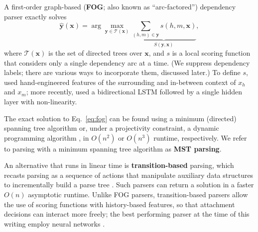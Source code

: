 \documentclass[11pt,letterpaper]{article}
\newcommand{\ignore}[1]{}
\newcommand{\miguelcomment}[1]{\ignore{\textcolor{red}{{\textbf{[#1 --\textsc{miguel}]}}}}}
\begin{document}
A first-order graph-based (\textbf{FOG}; also known as ``arc-factored'') dependency parser exactly solves
\begin{equation}
\boldsymbol{\hat{y}}(\boldsymbol{x}) = \arg\max_{\boldsymbol{y} \in \mathcal{T}(\boldsymbol{x})} \underbrace{\sum_{(h, m) \in \boldsymbol{y}} s(h, m, \boldsymbol{x})}_{S(\boldsymbol{y}, \boldsymbol{x})},
\label{eq:fog}
\end{equation}
where $\mathcal{T}(\boldsymbol{x})$ is the set of directed trees over $\boldsymbol{x}$, and
$s$ is a local scoring function that considers only a single dependency arc at a time.  (We 
suppress dependency labels; there are various ways to incorporate them, discussed later.)
To define $s$,  used hand-engineered features of the surrounding and in-between context of $x_h$ and $x_m$; more recently,  used a bidirectional LSTM followed by a single hidden layer with non-linearity.

The exact solution to Eq.~\ref{eq:fog} can be found using a minimum (directed) spanning tree algorithm \cite{nonprojective_mcdonald} or, under a projectivity constraint, a dynamic programming algorithm \cite{eisner}, in $O(n^2)$ or $O(n^3)$ runtime, respectively. We refer to parsing with a minimum spanning tree algorithm as \textbf{MST parsing}.

An alternative that runs in linear time is \textbf{transition-based} parsing, which recasts parsing as a sequence of actions that manipulate auxiliary data structures to incrementally build a parse tree \cite{Nivre2003}. Such parsers can return a solution in a faster $O(n)$ asymptotic runtime. Unlike FOG parsers, transition-based parsers allow the use of scoring functions with history-based features, so that attachment decisions can interact more freely; the best performing parser at the time of this writing employ neural networks \cite{globally_normalized}.
\ignore{\miguelcomment{The idea of adding the paragraph above as a footnote was if the below paragraph was included... not sure like this (the paragraph with the cheap alternative is ignored), but probably as it is now. Be careful with the claim about richer than FOG parsers... this might "offend" people and we do not want that.}}
\end{document}
